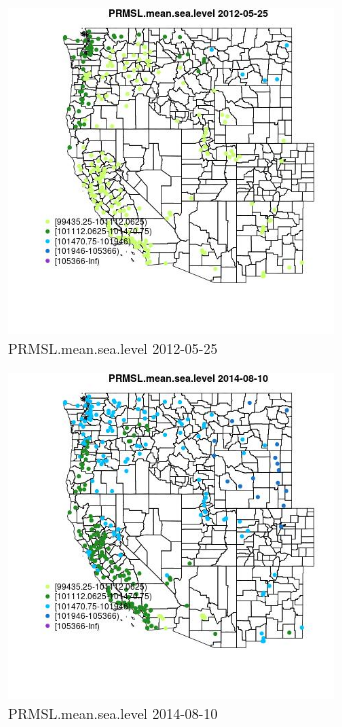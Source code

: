 \begin{figure} 
\centering  
\includegraphics[width=0.77\textwidth]{Code_Outputs/Report_ML_input_PM25_Step4_part_e_de_duplicated_aves_compiled_2019-05-18wNAs_MapObsPRMSLmeansealevel2012-05-25.jpg} 
\caption{\label{fig:Report_ML_input_PM25_Step4_part_e_de_duplicated_aves_compiled_2019-05-18wNAsMapObsPRMSLmeansealevel2012-05-25}PRMSL.mean.sea.level 2012-05-25} 
\end{figure} 
 

\clearpage 

\begin{figure} 
\centering  
\includegraphics[width=0.77\textwidth]{Code_Outputs/Report_ML_input_PM25_Step4_part_e_de_duplicated_aves_compiled_2019-05-18wNAs_MapObsPRMSLmeansealevel2014-08-10.jpg} 
\caption{\label{fig:Report_ML_input_PM25_Step4_part_e_de_duplicated_aves_compiled_2019-05-18wNAsMapObsPRMSLmeansealevel2014-08-10}PRMSL.mean.sea.level 2014-08-10} 
\end{figure} 
 

